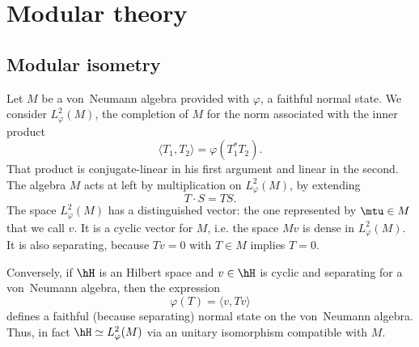 
					\section{Modular theory}

					\subsection{Modular isometry}

Let $M$ be a von~Neumann algebra provided with $\varphi$, a faithful normal state. We consider $L_{\varphi}^2(M)$, the completion of $M$ for the norm associated with the inner product
\begin{equation}
	\langle T_1, T_2\rangle =\varphi(T^*_1T_2).
\end{equation}
That product is conjugate-linear in his first argument and linear in the second. The algebra $M$ acts at left by multiplication on $L_{\varphi}^2(M)$, by extending
\begin{equation}
	T\cdot S = TS.
\end{equation}
The space $L_{\varphi}^2(M)$ has a distinguished vector: the one represented by $\mtu\in M$ that we call $v$. It is a cyclic vector for $M$, i.e. the space $Mv$ is dense in $ L_{\varphi}^2(M)$. It is also separating, because $Tv=0$ with $T\in M$ implies $T=0$.

Conversely, if $\hH$ is an Hilbert space and $v\in\hH$ is cyclic and separating for a von~Neumann algebra, then the expression
\begin{equation}
	\varphi(T)=\langle v, Tv\rangle 
\end{equation}
defines a faithful (because separating) normal state on the von~Neumann algebra. Thus, in fact $\hH\simeq  L_{\varphi}^2(M)$ via an unitary isomorphism compatible with $M$. 

